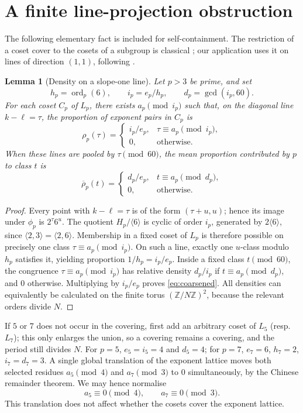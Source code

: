 \documentclass[11pt,a4paper]{article}
\newtheorem{lemma}{Lemma}
\newcommand{\ord}{\operatorname{ord}}
\newcommand{\Z}{\mathbb Z}
\begin{document}
\section{A finite line-projection obstruction}
The following elementary fact is included for self-containment. The restriction of a coset cover to the cosets of a subgroup is classical \cite{Neumann54,Tomkinson87,Sun06}; our application uses it on lines of direction $(1,1)$, following \cite{ProblemADayOct14}.

\begin{lemma}[Density on a slope-one line]\label{lem:lines}
Let $p>3$ be prime, and set
\[
  h_p=\ord_p(6),\qquad i_p=e_p/h_p,\qquad d_p=\gcd(i_p,60).
\]
For each coset $C_p$ of $L_p$, there exists $a_p\pmod{i_p}$ such that, on the diagonal line $k-\ell=\tau$, the proportion of exponent pairs in $C_p$ is
\[
 \rho_p(\tau)=\begin{cases}i_p/e_p,&\tau\equiv a_p\pmod {i_p},\\0,&\text{otherwise}.
 \end{cases}
\]
When these lines are pooled by $\tau\pmod {60}$, the mean proportion contributed by $p$ to class $t$ is
\begin{equation}\label{eq:coarsened}
  \overline\rho_p(t)=\begin{cases}
  d_p/e_p,&t\equiv a_p\pmod{d_p},\\0,&\text{otherwise}.
  \end{cases}
\end{equation}
\end{lemma}
\begin{proof}
Every point with $k-\ell=\tau$ is of the form $(\tau+u,u)$; hence its image under $\phi_p$ is $2^\tau6^u$. The quotient $H_p/\langle6\rangle$ is cyclic of order $i_p$, generated by $2\langle6\rangle$, since $\langle2,3\rangle=\langle2,6\rangle$. Membership in a fixed coset of $L_p$ is therefore possible on precisely one class $\tau\equiv a_p\pmod{i_p}$. On such a line, exactly one $u$-class modulo $h_p$ satisfies it, yielding proportion $1/h_p=i_p/e_p$. Inside a fixed class $t\pmod {60}$, the congruence $\tau\equiv a_p\pmod {i_p}$ has relative density $d_p/i_p$ if $t\equiv a_p\pmod {d_p}$, and $0$ otherwise. Multiplying by $i_p/e_p$ proves \eqref{eq:coarsened}. All densities can equivalently be calculated on the finite torus $(\Z/N\Z)^2$, because the relevant orders divide $N$.
\end{proof}

If $5$ or $7$ does not occur in the covering, first add an arbitrary coset of $L_5$ (resp.\ $L_7$); this only enlarges the union, so a covering remains a covering, and the period still divides $N$. For $p=5$, $e_5=i_5=4$ and $d_5=4$; for $p=7$, $e_7=6$, $h_7=2$, $i_7=d_7=3$. A single global translation of the exponent lattice moves both selected residues $a_5\pmod4$ and $a_7\pmod3$ to $0$ simultaneously, by the Chinese remainder theorem. We may hence normalise
\begin{equation}\label{eq:normalized}
  a_5\equiv0\pmod4,\qquad a_7\equiv0\pmod3.
\end{equation}
This translation does not affect whether the cosets cover the exponent lattice.
\end{document}

